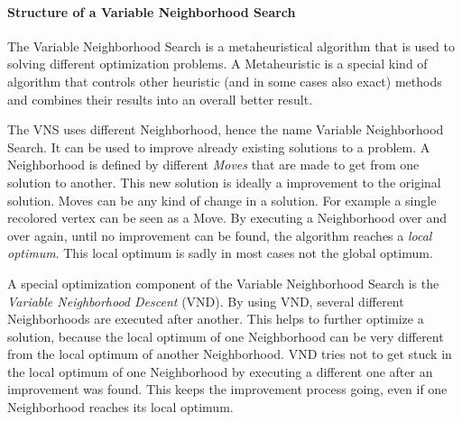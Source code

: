 \documentclass[paper=a4,fontsize=12pt]{scrartcl}
\begin{document}
\paragraph{Structure of a Variable Neighborhood Search}{
The Variable Neighborhood Search is a metaheuristical algorithm that is used to solving different optimization problems. A Metaheuristic is a special kind of algorithm that controls other heuristic (and in some cases also exact) methods and combines their results into an overall better result.


The VNS uses different Neighborhood, hence the name Variable Neighborhood Search. It can be used to improve already existing solutions to a problem. A Neighborhood is defined by different \emph{Moves} that are made to get from one solution to another. This new solution is ideally a improvement to the original solution. Moves can be any kind of change in a solution. For example a single recolored vertex can be seen as a Move. By executing a Neighborhood over and over again, until no improvement can be found, the algorithm reaches a \emph{local optimum}. This local optimum is sadly in most cases not the global optimum.


A special optimization component of the Variable Neighborhood Search is the \emph{Variable Neighborhood Descent} (VND). By using VND, several different Neighborhoods are executed after another. This helps to further optimize a solution, because the local optimum of one Neighborhood can be very different from the local optimum of another Neighborhood. VND tries not to get stuck in the local optimum of one Neighborhood by executing a different one after an improvement was found. This keeps the improvement process going, even if one Neighborhood reaches its local optimum. 

}
\end{document}
